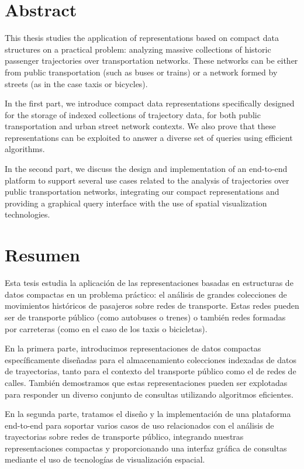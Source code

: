 
\chapter*{Abstract}

This thesis studies the application of representations based on compact data structures on a practical problem: analyzing massive collections of historic passenger trajectories over transportation networks. These networks can be either from public transportation (such as buses or trains) or a network formed by streets (as in the case taxis or bicycles).

In the first part, we introduce compact data representations specifically designed for the storage of indexed collections of trajectory data, for both public transportation and urban street network contexts. We also prove that these representations can be exploited to answer a diverse set of queries using efficient algorithms.

In the second part, we discuss the design and implementation of an end-to-end platform to support several use cases related to the analysis of trajectories over public transportation networks, integrating our compact representations and providing a graphical query interface with the use of spatial visualization technologies.

\chapter*{Resumen}

Esta tesis estudia la aplicaci\'on de las representaciones basadas en estructuras de datos compactas en un problema pr\'actico: el an\'alisis de grandes colecciones de movimientos hist\'oricos de pasajeros sobre redes de transporte. Estas redes pueden ser de transporte p\'ublico (como autobuses o trenes) o tambi\'en redes formadas por carreteras (como en el caso de los taxis o bicicletas).

En la primera parte, introducimos representaciones de datos compactas espec\'ificamente dise\~nadas para el almacenamiento colecciones indexadas de datos de trayectorias, tanto para el contexto del transporte p\'ublico como el de redes de calles. Tambi\'en demostramos que estas representaciones pueden ser explotadas para responder un diverso conjunto de consultas utilizando algoritmos eficientes.

En la segunda parte, tratamos el dise\~no y la implementaci\'on de una plataforma end-to-end para soportar varios casos de uso relacionados con el an\'alisis de trayectorias sobre redes de transporte p\'ublico, integrando nuestras representaciones compactas y proporcionando una interfaz gr\'afica de consultas mediante el uso de tecnolog\'ias de visualizaci\'on espacial.

